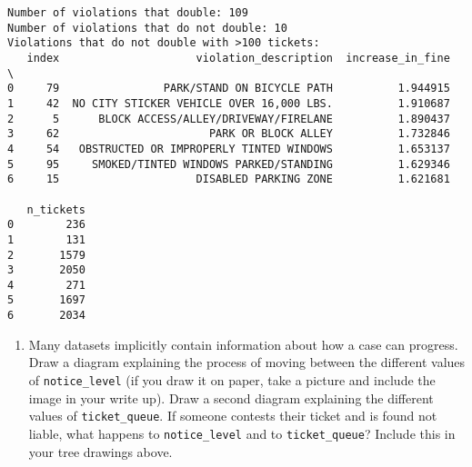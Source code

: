 \documentclass[
  letterpaper,
  DIV=11,
  numbers=noendperiod]{scrartcl}
\providecommand{\tightlist}{%
  \setlength{\itemsep}{0pt}\setlength{\parskip}{0pt}}\usepackage{longtable,booktabs,array}
\begin{document}
\begin{verbatim}
Number of violations that double: 109
Number of violations that do not double: 10
Violations that do not double with >100 tickets:
   index                     violation_description  increase_in_fine  \
0     79                PARK/STAND ON BICYCLE PATH          1.944915   
1     42  NO CITY STICKER VEHICLE OVER 16,000 LBS.          1.910687   
2      5      BLOCK ACCESS/ALLEY/DRIVEWAY/FIRELANE          1.890437   
3     62                       PARK OR BLOCK ALLEY          1.732846   
4     54   OBSTRUCTED OR IMPROPERLY TINTED WINDOWS          1.653137   
5     95     SMOKED/TINTED WINDOWS PARKED/STANDING          1.629346   
6     15                     DISABLED PARKING ZONE          1.621681   

   n_tickets  
0        236  
1        131  
2       1579  
3       2050  
4        271  
5       1697  
6       2034  
\end{verbatim}

\begin{enumerate}
\def\labelenumi{\arabic{enumi}.}
\setcounter{enumi}{4}
\tightlist
\item
  Many datasets implicitly contain information about how a case can
  progress. Draw a diagram explaining the process of moving between the
  different values of \texttt{notice\_level} (if you draw it on paper,
  take a picture and include the image in your write up). Draw a second
  diagram explaining the different values of \texttt{ticket\_queue}. If
  someone contests their ticket and is found not liable, what happens to
  \texttt{notice\_level} and to \texttt{ticket\_queue}? Include this in
  your tree drawings above.
\end{enumerate}
\end{document}
